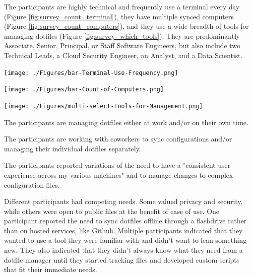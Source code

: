 \documentclass[letterpaper]{jdf}
\begin{document}
 The participants are highly technical and frequently use a terminal every day (Figure \ref{fig:survey_count_terminal}), they have multiple synced computers (Figure \ref{fig:survey_count_computers}), and they use a wide breadth of tools for managing dotfiles (Figure \ref{fig:survey_which_tools}). They are predominantly Associate, Senior, Principal, or Staff Software Engineers, but also include two Technical Leads, a Cloud Security Engineer, an Analyst, and a Data Scientist.

\begin{jdffigure}
\texttt{[image: ./Figures/bar-Terminal-Use-Frequency.png]}
\label{fig:survey_count_terminal}
\end{jdffigure}

\begin{jdffigure}
\texttt{[image: ./Figures/bar-Count-of-Computers.png]}
\label{fig:survey_count_computers}
\end{jdffigure}

\begin{jdffigure}
\texttt{[image: ./Figures/multi-select-Tools-for-Management.png]}
\label{fig:survey_which_tools}
\end{jdffigure}

 The participants are managing dotfiles either at work and/or on their own time.

 The participants are working with coworkers to sync configurations and/or managing their individual dotfiles separately.

 The participants reported variations of the need to have a "consistent user experience across my various machines" and to manage changes to complex configuration files.

 Different participants had competing needs. Some valued privacy and security, while others were open to public files at the benefit of ease of use. One participant reported the need to sync dotfiles offline through a flashdrive rather than on hosted services, like Github. Multiple participants indicated that they wanted to use a tool they were familiar with and didn't want to lean something new. They also indicated that they didn't always know what they need from a dotfile manager until they started tracking files and developed custom scripts that fit their immediate needs.
\end{document}
